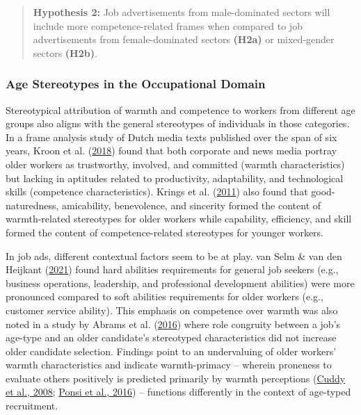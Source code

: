 \documentclass[
  12pt,
  letterpaper,
  DIV=11,
  numbers=noendperiod]{scrartcl}
\begin{document}
\begin{quote}
\textbf{Hypothesis 2:} Job advertisements from male-dominated sectors
will include more competence-related frames when compared to job
advertisements from female-dominated sectors \textbf{(H2a)} or
mixed-gender sectors \textbf{(H2b)}.
\end{quote}

\hypertarget{age}{%
\subsubsection{Age Stereotypes in the Occupational Domain}\label{age}}

Stereotypical attribution of warmth and competence to workers from
different age groups also aligns with the general stereotypes of
individuals in those categories. In a frame analysis study of Dutch
media texts published over the span of six years, Kroon et al.
(\protect\hyperlink{ref-kroon2018ReliableUnproductiveStereotypes}{2018})
found that both corporate and news media portray older workers as
trustworthy, involved, and committed (warmth characteristics) but
lacking in aptitudes related to productivity, adaptability, and
technological skills (competence characteristics). Krings et al.
(\protect\hyperlink{ref-krings2011StereotypicalInferencesMediators}{2011})
also found that good-naturedness, amicability, benevolence, and
sincerity formed the content of warmth-related stereotypes for older
workers while capability, efficiency, and skill formed the content of
competence-related stereotypes for younger workers.

In job ads, different contextual factors seem to be at play. van Selm \&
van den Heijkant
(\protect\hyperlink{ref-vanselm2021SearchOlderWorker}{2021}) found hard
abilities requirements for general job seekers (e.g., business
operations, leadership, and professional development abilities) were
more pronounced compared to soft abilities requirements for older
workers (e.g., customer service ability). This emphasis on competence
over warmth was also noted in a study by Abrams et al.
(\protect\hyperlink{ref-abrams2016OldUnemployableHow}{2016}) where role
congruity between a job's age-type and an older candidate's stereotyped
characteristics did not increase older candidate selection. Findings
point to an undervaluing of older workers' warmth characteristics and
indicate warmth-primacy -- wherein proneness to evaluate others
positively is predicted primarily by warmth perceptions
(\protect\hyperlink{ref-cuddy2008WarmthCompetenceUniversal}{Cuddy et
al., 2008};
\protect\hyperlink{ref-ponsi2016InfluenceWarmthCompetence}{Ponsi et al.,
2016}) -- functions differently in the context of age-typed recruitment.
\end{document}
